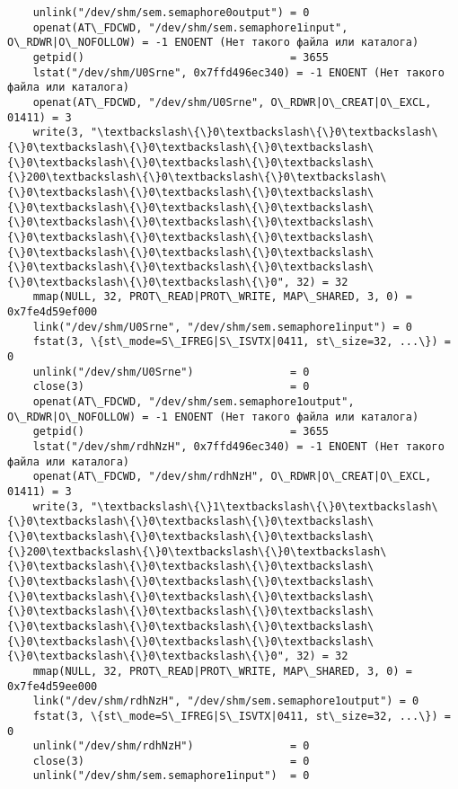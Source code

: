 \documentclass[a4paper, 12pt]{article}
\begin{document}
\begin{verbatim}
	unlink("/dev/shm/sem.semaphore0output") = 0
	openat(AT\_FDCWD, "/dev/shm/sem.semaphore1input", O\_RDWR|O\_NOFOLLOW) = -1 ENOENT (Нет такого файла или каталога)
	getpid()                                = 3655
	lstat("/dev/shm/U0Srne", 0x7ffd496ec340) = -1 ENOENT (Нет такого файла или каталога)
	openat(AT\_FDCWD, "/dev/shm/U0Srne", O\_RDWR|O\_CREAT|O\_EXCL, 01411) = 3
	write(3, "\textbackslash\{\}0\textbackslash\{\}0\textbackslash\{\}0\textbackslash\{\}0\textbackslash\{\}0\textbackslash\{\}0\textbackslash\{\}0\textbackslash\{\}0\textbackslash\{\}200\textbackslash\{\}0\textbackslash\{\}0\textbackslash\{\}0\textbackslash\{\}0\textbackslash\{\}0\textbackslash\{\}0\textbackslash\{\}0\textbackslash\{\}0\textbackslash\{\}0\textbackslash\{\}0\textbackslash\{\}0\textbackslash\{\}0\textbackslash\{\}0\textbackslash\{\}0\textbackslash\{\}0\textbackslash\{\}0\textbackslash\{\}0\textbackslash\{\}0\textbackslash\{\}0\textbackslash\{\}0\textbackslash\{\}0\textbackslash\{\}0\textbackslash\{\}0", 32) = 32
	mmap(NULL, 32, PROT\_READ|PROT\_WRITE, MAP\_SHARED, 3, 0) = 0x7fe4d59ef000
	link("/dev/shm/U0Srne", "/dev/shm/sem.semaphore1input") = 0
	fstat(3, \{st\_mode=S\_IFREG|S\_ISVTX|0411, st\_size=32, ...\}) = 0
	unlink("/dev/shm/U0Srne")               = 0
	close(3)                                = 0
	openat(AT\_FDCWD, "/dev/shm/sem.semaphore1output", O\_RDWR|O\_NOFOLLOW) = -1 ENOENT (Нет такого файла или каталога)
	getpid()                                = 3655
	lstat("/dev/shm/rdhNzH", 0x7ffd496ec340) = -1 ENOENT (Нет такого файла или каталога)
	openat(AT\_FDCWD, "/dev/shm/rdhNzH", O\_RDWR|O\_CREAT|O\_EXCL, 01411) = 3
	write(3, "\textbackslash\{\}1\textbackslash\{\}0\textbackslash\{\}0\textbackslash\{\}0\textbackslash\{\}0\textbackslash\{\}0\textbackslash\{\}0\textbackslash\{\}0\textbackslash\{\}200\textbackslash\{\}0\textbackslash\{\}0\textbackslash\{\}0\textbackslash\{\}0\textbackslash\{\}0\textbackslash\{\}0\textbackslash\{\}0\textbackslash\{\}0\textbackslash\{\}0\textbackslash\{\}0\textbackslash\{\}0\textbackslash\{\}0\textbackslash\{\}0\textbackslash\{\}0\textbackslash\{\}0\textbackslash\{\}0\textbackslash\{\}0\textbackslash\{\}0\textbackslash\{\}0\textbackslash\{\}0\textbackslash\{\}0\textbackslash\{\}0\textbackslash\{\}0", 32) = 32
	mmap(NULL, 32, PROT\_READ|PROT\_WRITE, MAP\_SHARED, 3, 0) = 0x7fe4d59ee000
	link("/dev/shm/rdhNzH", "/dev/shm/sem.semaphore1output") = 0
	fstat(3, \{st\_mode=S\_IFREG|S\_ISVTX|0411, st\_size=32, ...\}) = 0
	unlink("/dev/shm/rdhNzH")               = 0
	close(3)                                = 0
	unlink("/dev/shm/sem.semaphore1input")  = 0

\end{verbatim}
\end{document}
